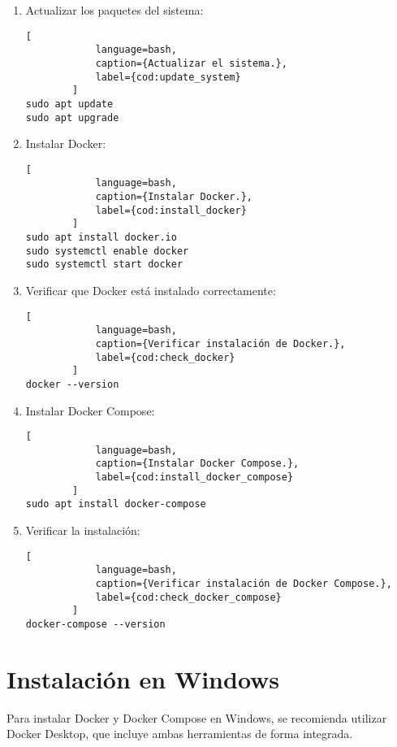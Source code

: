 \begin{enumerate}
    \item Actualizar los paquetes del sistema:
    \begin{lstlisting}[
			language=bash,
			caption={Actualizar el sistema.},
			label={cod:update_system}
		]
sudo apt update
sudo apt upgrade
		\end{lstlisting}
    
    \item Instalar Docker:
    \begin{lstlisting}[
			language=bash,
			caption={Instalar Docker.},
			label={cod:install_docker}
		]
sudo apt install docker.io
sudo systemctl enable docker
sudo systemctl start docker
    \end{lstlisting}
    
    \item Verificar que Docker está instalado correctamente:
    \begin{lstlisting}[
			language=bash,
			caption={Verificar instalación de Docker.},
			label={cod:check_docker}
		]
docker --version
    \end{lstlisting}
    
    \item Instalar Docker Compose:
    \begin{lstlisting}[
			language=bash,
			caption={Instalar Docker Compose.},
			label={cod:install_docker_compose}
		]
sudo apt install docker-compose
    \end{lstlisting}
    
    \item Verificar la instalación:
    \begin{lstlisting}[
			language=bash,
			caption={Verificar instalación de Docker Compose.},
			label={cod:check_docker_compose}
		]
docker-compose --version
    \end{lstlisting}
\end{enumerate}

\section{Instalación en Windows}

Para instalar Docker y Docker Compose en Windows, se recomienda utilizar Docker Desktop, que incluye ambas herramientas de forma integrada.

